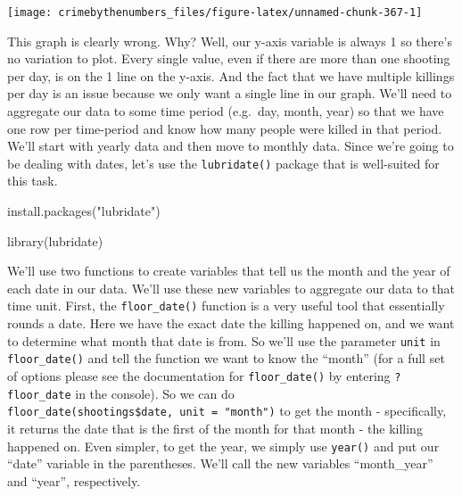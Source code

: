 \documentclass[
]{krantz}
\makeatletter
\newenvironment{Shaded}{\begin{snugshade}}{\end{snugshade}}
\newcommand{\FunctionTok}[1]{\textcolor[rgb]{0,0,0}{#1}}
\newcommand{\NormalTok}[1]{#1}
\newcommand{\StringTok}[1]{\textcolor[rgb]{0.5,0.5,0.5}{#1}}
\newenvironment{kframe}{%
\medskip{}
\setlength{\fboxsep}{.8em}
 \def\at@end@of@kframe{}%
 \ifinner\ifhmode%
  \def\at@end@of@kframe{\end{minipage}}%
  \begin{minipage}{\columnwidth}%
 \fi\fi%
 \def\FrameCommand##1{\hskip\@totalleftmargin \hskip-\fboxsep
 \colorbox{shadecolor}{##1}\hskip-\fboxsep
     \hskip-\linewidth \hskip-\@totalleftmargin \hskip\columnwidth}%
 \MakeFramed {\advance\hsize-\width
   \@totalleftmargin\z@ \linewidth\hsize
   \@setminipage}}%
 {\par\unskip\endMakeFramed%
 \at@end@of@kframe}
\renewenvironment{Shaded}{\begin{kframe}}{\end{kframe}}
\makeatother
\begin{document}
\begin{center}\texttt{[image: crimebythenumbers\_files/figure-latex/unnamed-chunk-367-1]} \end{center}

This graph is clearly wrong. Why? Well, our y-axis variable
is always 1 so there's no variation to plot. Every single
value, even if there are more than one shooting per day, is
on the 1 line on the y-axis. And the fact that we have
multiple killings per day is an issue because we only want a
single line in our graph. We'll need to aggregate our data
to some time period (e.g.~day, month, year) so that we have
one row per time-period and know how many people were killed
in that period. We'll start with yearly data and then move
to monthly data. Since we're going to be dealing with dates,
let's use the \texttt{lubridate()} package that is
well-suited for this task.

\begin{Shaded}
\begin{Highlighting}[]
\FunctionTok{install.packages}\NormalTok{(}\StringTok{"lubridate"}\NormalTok{)}
\end{Highlighting}
\end{Shaded}

\begin{Shaded}
\begin{Highlighting}[]
\FunctionTok{library}\NormalTok{(lubridate)}
\end{Highlighting}
\end{Shaded}

We'll use two functions to create variables that tell us the
month and the year of each date in our data. We'll use these
new variables to aggregate our data to that time unit.
First, the \texttt{floor\_date()} function is a very useful
tool that essentially rounds a date. Here we have the exact
date the killing happened on, and we want to determine what
month that date is from. So we'll use the parameter
\texttt{unit} in \texttt{floor\_date()} and tell the
function we want to know the ``month'' (for a full set of
options please see the documentation for
\texttt{floor\_date()} by entering \texttt{?floor\_date} in
the console). So we can do
\texttt{floor\_date(shootings\$date,\ unit\ =\ "month")} to
get the month - specifically, it returns the date that is
the first of the month for that month - the killing happened
on. Even simpler, to get the year, we simply use
\texttt{year()} and put our ``date'' variable in the
parentheses. We'll call the new variables ``month\_year''
and ``year'', respectively.
\end{document}
